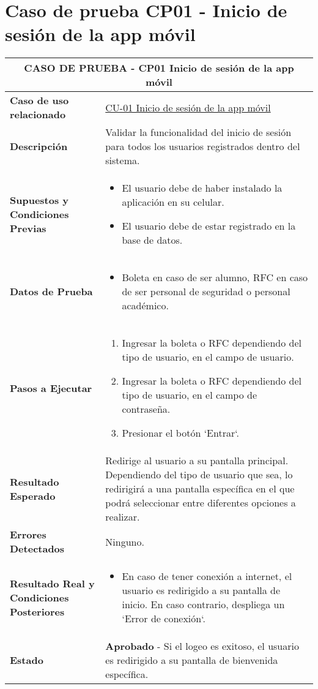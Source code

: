 
\section{Caso de prueba CP01 - Inicio de sesión de la app móvil}

\begin{longtable}{|p{5cm}|p{10cm}|}
	\hline
	\multicolumn{2}{|c|}{\textbf{CASO DE PRUEBA - CP01 Inicio de sesión de la app móvil}} \\
	\hline
	\textbf{Caso de uso relacionado} & \hyperref[CU-01]{CU-01 Inicio de sesión de la app móvil} \\
	\hline
	\textbf{Descripción} & Validar la funcionalidad del inicio de sesión para todos los usuarios registrados dentro del sistema. \\
	\hline
	\textbf{Supuestos y Condiciones Previas} & 
	\begin{itemize}
		\item El usuario debe de haber instalado la aplicación en su celular.
		\item El usuario debe de estar registrado en la base de datos.
	\end{itemize} \\
	\hline
	\textbf{Datos de Prueba} & 
	\begin{itemize}
		\item Boleta en caso de ser alumno, RFC en caso de ser personal de seguridad o personal académico.
	\end{itemize} \\
	\hline
	\textbf{Pasos a Ejecutar} & 
	\begin{enumerate}
		\item Ingresar la boleta o RFC dependiendo del tipo de usuario, en el campo de usuario.
		\item Ingresar la boleta o RFC dependiendo del tipo de usuario, en el campo de contraseña.
		\item Presionar el botón `Entrar`.
	\end{enumerate} \\
	\hline
	\textbf{Resultado Esperado} & 
	Redirige al usuario a su pantalla principal. Dependiendo del tipo de usuario que sea, lo redirigirá a una pantalla específica en el que podrá seleccionar entre diferentes opciones a realizar. \\
	\hline
	\textbf{Errores Detectados} & 
	Ninguno. \\
	\hline
	\textbf{Resultado Real y Condiciones Posteriores} & 
	\begin{itemize}
		\item En caso de tener conexión a internet, el usuario es redirigido a su pantalla de inicio. En caso contrario, despliega un `Error de conexión`.
	\end{itemize} \\
	\hline
	\textbf{Estado} & 
	\textbf{Aprobado} - Si el logeo es exitoso, el usuario es redirigido a su pantalla de bienvenida específica.   \\
	\hline
\end{longtable}